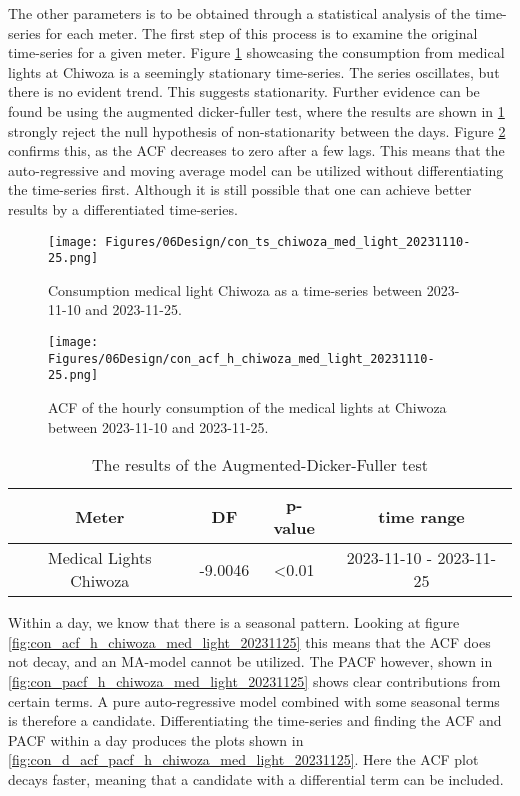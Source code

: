 The other parameters is to be obtained through a statistical analysis of the time-series for each meter. The first step of this process is to examine the original time-series for a given meter. Figure \ref{fig:con_ts_chiwoza_med_light_20231110-25} showcasing the consumption from medical lights at Chiwoza is a seemingly stationary time-series. The series oscillates, but there is no evident trend. This suggests stationarity. Further evidence can be found be using the augmented dicker-fuller test, where the results are shown in \ref{tab:result_dicker-fuller} strongly reject the null hypothesis of non-stationarity between the days. Figure \ref{fig:con_acf_h_chiwoza_med_light_20231110-25} confirms this, as the ACF decreases to zero after a few lags. This means that the auto-regressive and moving average model can be utilized without differentiating the time-series first. Although it is still possible that one can achieve better results by a differentiated time-series.\\


\begin{figure}
    \centering
    \texttt{[image: Figures/06Design/con\_ts\_chiwoza\_med\_light\_20231110-25.png]}
    \caption[Medical Light consumption Chiwoza 20231110-1125]{Consumption medical light Chiwoza as a time-series between 2023-11-10 and 2023-11-25.}
    \label{fig:con_ts_chiwoza_med_light_20231110-25}
\end{figure}

\begin{figure}
    \centering
    \texttt{[image: Figures/06Design/con\_acf\_h\_chiwoza\_med\_light\_20231110-25.png]}
    \caption[ACF Medical Light consumption Chiwoza 20231110-1125]{ACF of the hourly consumption of the medical lights at Chiwoza between 2023-11-10 and 2023-11-25.}
    \label{fig:con_acf_h_chiwoza_med_light_20231110-25}
\end{figure}


\begin{table}[]
    \centering
    \begin{tabular}{c|c|c|c}
    Meter & DF & p-value & time range \\
    \hline
    Medical Lights Chiwoza & -9.0046 & <0.01 & 2023-11-10 - 2023-11-25
    \end{tabular}
    \caption[Dicker-Fuller test]{The results of the Augmented-Dicker-Fuller test}
    \label{tab:result_dicker-fuller}
\end{table}

Within a day, we know that there is a seasonal pattern. Looking at figure \ref{fig:con_acf_h_chiwoza_med_light_20231125} this means that the ACF does not decay, and an MA-model cannot be utilized. The PACF however, shown in \ref{fig:con_pacf_h_chiwoza_med_light_20231125} shows clear contributions from certain terms. A pure auto-regressive model combined with some seasonal terms is therefore a candidate. Differentiating the time-series and finding the ACF and PACF within a day produces the plots shown in \ref{fig:con_d_acf_pacf_h_chiwoza_med_light_20231125}. Here the ACF plot decays faster, meaning that a candidate with a differential term can be included.\\

